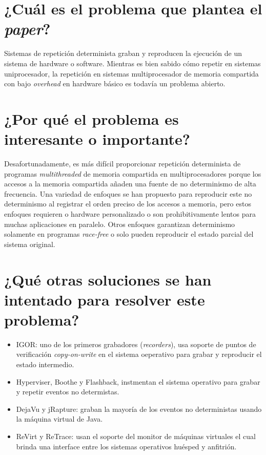\section{¿Cuál es el problema que plantea el \textit{paper}?}
Sistemas de repetición determinista graban y reproducen la ejecución de un sistema de hardware o software. Mientras es bien sabido cómo repetir en sistemas uniprocesador, la repetición en sistemas multiprocesador de memoria compartida con bajo \emph{overhead} en hardware básico es todavía un problema abierto.

\section{¿Por qué el problema es interesante o importante?}
Desafortunadamente, es más difícil proporcionar repetición determinista de programas \emph{multithreaded} de memoria compartida en multiprocesadores porque los accesos a la memoria compartida añaden una fuente de no determinismo de alta frecuencia. Una variedad de enfoques se han propuesto para reproducir este no determinismo al registrar el orden preciso de los accesos a memoria, pero estos enfoques requieren o hardware personalizado o son prohibitivamente lentos para muchas aplicaciones en paralelo. Otros enfoques garantizan determinismo solamente en programas \emph{race-free} o solo pueden reproducir el estado parcial del sistema original.

\section{¿Qué otras soluciones se han intentado para resolver este problema?}
\begin{itemize}
    \item IGOR: uno de los primeros grabadores (\emph{recorders}), usa soporte de puntos de verificación \emph{copy-on-write} en el sistema oeperativo para grabar y reproducir el estado intermedio.
    \item Hyperviser, Boothe y Flashback, instmentan el sistema operativo para grabar y repetir eventos no determistas.
    \item DejaVu y jRapture: graban la mayoría de los eventos no deterministas usando la máquina virtual de Java. 
    \item ReVirt y ReTrace: usan el soporte del monitor de máquinas virtuales el cual brinda una interface entre los sistemas operativos huésped y anfitrión.
\end{itemize}

